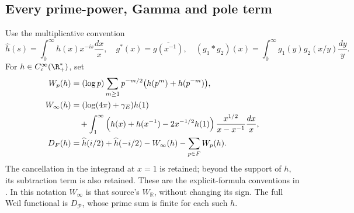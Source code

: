 \documentclass[11pt,a4paper]{article}
\theoremstyle{definition}\newtheorem{definition}[theorem]{Definition}
\begin{document}
\subsection{Every prime-power, Gamma and pole term}
Use the multiplicative convention
\[
 \widehat h(s)=\int_0^\infty h(x)x^{-is}\frac{dx}{x},\quad
 g^*(x)=\overline{g(x^{-1})},\quad
 (g_1*g_2)(x)=\int_0^\infty g_1(y)g_2(x/y)\frac{dy}{y}.
\]
For $h\in C_c^\infty(\R_+^*)$, set
\begin{align}
 W_p(h)&=(\log p)\sum_{m\ge1}p^{-m/2}\bigl(h(p^m)+h(p^{-m})\bigr),\label{eq:rebuilt-Wp}\\
 W_\infty(h)&=(\log(4\pi)+\gamma_E)h(1)\notag\\
 &\quad+\int_1^\infty\left(h(x)+h(x^{-1})-2x^{-1/2}h(1)\right)
 \frac{x^{1/2}}{x-x^{-1}}\frac{dx}{x},\label{eq:rebuilt-Winf}\\
 D_F(h)&=\widehat h(i/2)+\widehat h(-i/2)-W_\infty(h)-\sum_{p\in F}W_p(h).
 \label{eq:rebuilt-D}
\end{align}
The cancellation in the integrand at $x=1$ is retained; beyond the support of $h$, its subtraction term is also retained. These are the explicit-formula conventions in \cite[\texttt{wp}, \texttt{arch}, \texttt{sectweilpos}]{Connes2026}. In this notation $W_\infty$ is that source's $W_{\mathbb R}$, without changing its sign. The full Weil functional is $D_{\mathcal P}$, whose prime sum is finite for each such $h$.
\end{document}
